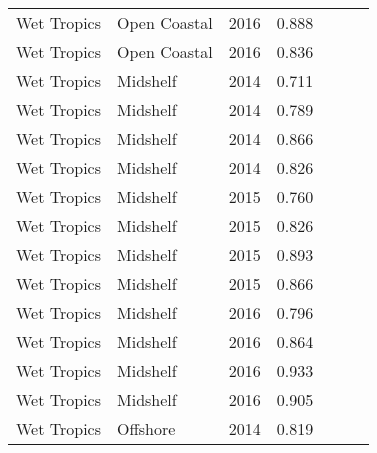 {\begin{longtable}{llccccc}
  Wet Tropics & Open Coastal & 2016 & 0.888 & \cellcolor[HTML]{00734D}{A} & \cellcolor[HTML]{00734D}{A} & \cellcolor[HTML]{00734D}{A} \\ 
  Wet Tropics & Open Coastal & 2016 & 0.836 & \cellcolor[HTML]{00734D}{A} & \cellcolor[HTML]{00734D}{A} & \cellcolor[HTML]{B0D235}{B} \\ 
  Wet Tropics & Midshelf & 2014 & 0.711 & \cellcolor[HTML]{B0D235}{B} & \cellcolor[HTML]{B0D235}{B} & \cellcolor[HTML]{B0D235}{B} \\ 
  Wet Tropics & Midshelf & 2014 & 0.789 & \cellcolor[HTML]{B0D235}{B} & \cellcolor[HTML]{B0D235}{B} & \cellcolor[HTML]{B0D235}{B} \\ 
  Wet Tropics & Midshelf & 2014 & 0.866 & \cellcolor[HTML]{00734D}{A} & \cellcolor[HTML]{00734D}{A} & \cellcolor[HTML]{00734D}{A} \\ 
  Wet Tropics & Midshelf & 2014 & 0.826 & \cellcolor[HTML]{B0D235}{B} & \cellcolor[HTML]{00734D}{A} & \cellcolor[HTML]{B0D235}{B} \\ 
  Wet Tropics & Midshelf & 2015 & 0.760 & \cellcolor[HTML]{B0D235}{B} & \cellcolor[HTML]{B0D235}{B} & \cellcolor[HTML]{B0D235}{B} \\ 
  Wet Tropics & Midshelf & 2015 & 0.826 & \cellcolor[HTML]{B0D235}{B} & \cellcolor[HTML]{00734D}{A} & \cellcolor[HTML]{B0D235}{B} \\ 
  Wet Tropics & Midshelf & 2015 & 0.893 & \cellcolor[HTML]{00734D}{A} & \cellcolor[HTML]{00734D}{A} & \cellcolor[HTML]{00734D}{A} \\ 
  Wet Tropics & Midshelf & 2015 & 0.866 & \cellcolor[HTML]{00734D}{A} & \cellcolor[HTML]{00734D}{A} & \cellcolor[HTML]{00734D}{A} \\ 
  Wet Tropics & Midshelf & 2016 & 0.796 & \cellcolor[HTML]{B0D235}{B} & \cellcolor[HTML]{B0D235}{B} & \cellcolor[HTML]{B0D235}{B} \\ 
  Wet Tropics & Midshelf & 2016 & 0.864 & \cellcolor[HTML]{00734D}{A} & \cellcolor[HTML]{00734D}{A} & \cellcolor[HTML]{00734D}{A} \\ 
  Wet Tropics & Midshelf & 2016 & 0.933 & \cellcolor[HTML]{00734D}{A} & \cellcolor[HTML]{00734D}{A} & \cellcolor[HTML]{00734D}{A} \\ 
  Wet Tropics & Midshelf & 2016 & 0.905 & \cellcolor[HTML]{00734D}{A} & \cellcolor[HTML]{00734D}{A} & \cellcolor[HTML]{00734D}{A} \\ 
  Wet Tropics & Offshore & 2014 & 0.819 & \cellcolor[HTML]{B0D235}{B} & \cellcolor[HTML]{00734D}{A} & \cellcolor[HTML]{B0D235}{B} \\ 

\end{longtable}}
